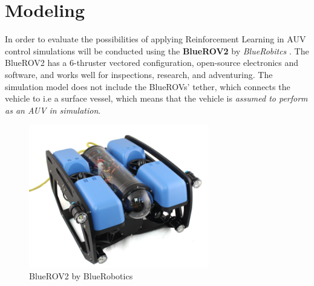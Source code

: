 \chapter{Modeling} \label{chap:modeling}
In order to evaluate the possibilities of applying Reinforcement Learning in AUV control simulations will be conducted using the \textbf{BlueROV2} by \textit{BlueRobitcs} \cite{blue}. The BlueROV2 has a 6-thruster vectored configuration, open-source electronics and software, and works well for inspections, research, and adventuring. The simulation model does not include the BlueROVs' tether, which connects the vehicle to i.e a surface vessel, which means that the vehicle is \textit{assumed to perform as an AUV in simulation}. 
\begin{figure}[H]
    \centering
    \includegraphics[width=0.7\textwidth]{images/chap4/bluerov2.png}
    \caption{BlueROV2 by BlueRobotics \cite{blue}}
    \label{fig:bluerov2}
\end{figure}

